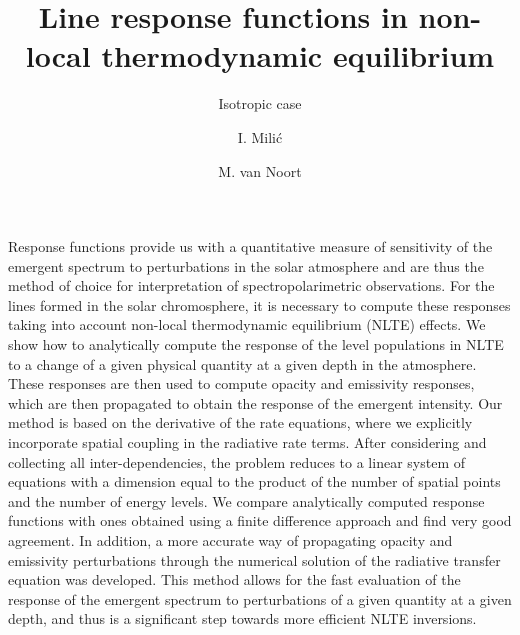 \documentclass[referee]{aa}
\begin{document}
   \title{Line response functions in non-local thermodynamic equilibrium}

   \subtitle{Isotropic case}

   \author{I. Mili\'{c}
   \and
   M. van Noort}
   

   \date{}


  \abstract
   {Response functions provide us with a quantitative measure of sensitivity of the emergent spectrum to perturbations in the solar atmosphere and are thus the method of choice for interpretation of spectropolarimetric observations. For the lines formed in the solar chromosphere, it is necessary to compute these responses taking into account non-local thermodynamic equilibrium (NLTE) effects.}  
  {We show how to analytically compute the response of the level populations in NLTE to a change of a given physical quantity at a given depth in the atmosphere. These responses are then used to compute opacity and emissivity responses, which are then propagated to obtain the response of the emergent intensity.}
   {Our method is based on the derivative of the rate equations, where we explicitly incorporate spatial coupling in the radiative rate terms. After considering and collecting all inter-dependencies, the problem reduces to a linear system of equations with a dimension equal to the product of the number of spatial points and the number of energy levels.}
   {We compare analytically computed response functions with ones obtained using a finite difference approach and find very good agreement. In addition, a more accurate way of propagating opacity and emissivity perturbations through the numerical solution of the radiative transfer equation was developed.} 
   {This method allows for the fast evaluation of the response of the emergent spectrum to perturbations of a given quantity at a given depth, and thus is a significant step towards more efficient NLTE inversions.}
 
\end{document}
